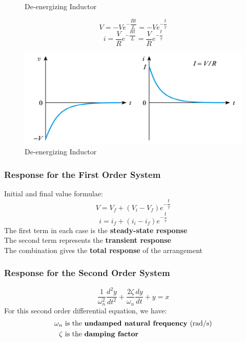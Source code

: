 \documentclass[UTF8]{article}
\begin{document}
\begin{itemize}
\begin{figure}[H]
\caption{De-energizing Inductor}
\end{figure}
$$V=-Ve^{-\dfrac{Rt}{L}}=-Ve^{-\dfrac{t}{\tau}}$$
$$i=\dfrac{V}{R}e^{-\dfrac{Rt}{L}}=\dfrac{V}{R}e^{-\dfrac{t}{\tau}}$$
\begin{figure}[H]
\centering
\includegraphics[scale=0.9]{b4.PNG}
\caption{De-energizing Inductor}
\end{figure}
\end{itemize}

\subsubsection{Response for the First Order System}
Initial and final value formulae:
$$V=V_f+(V_i-V_f)e^{-\dfrac{t}{\tau}}$$
$$i=i_f+(i_i-i_f)e^{-\dfrac{t}{\tau}}$$
 {The first term in each case is the \textbf{steady-state response}}\\
 {The second term represents the \textbf{transient response}}\\
 {The combination gives the \textbf{total response} of the arrangement}

\subsubsection{Response for the Second Order System}
$$\dfrac{1}{\omega _n^2}\dfrac{d^2y}{dt^2}+\dfrac{2\zeta }{\omega _n}\dfrac{dy}{dt}+y=x$$
 {For this second order differential equation, we have:}
\begin{align*}
\omega _n & \text{ is the \textbf{undamped natural frequency} (rad/s)}\\
\zeta & \text{ is the \textbf{damping factor}}
\end{align*}
\end{document}
